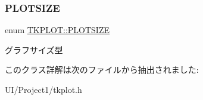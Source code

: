 \subsubsection{\texorpdfstring{P\+L\+O\+T\+S\+I\+ZE}{PLOTSIZE}}
{\footnotesize\ttfamily enum \hyperlink{class_t_k_p_l_o_t_a158082ae168750554cf23edde9a27416}{T\+K\+P\+L\+O\+T\+::\+P\+L\+O\+T\+S\+I\+ZE}\hspace{0.3cm}{\ttfamily [strong]}}

グラフサイズ型 

このクラス詳解は次のファイルから抽出されました\+:\begin{DoxyCompactItemize}
\item 
U\+I/\+Project1/tkplot.\+h\end{DoxyCompactItemize}
